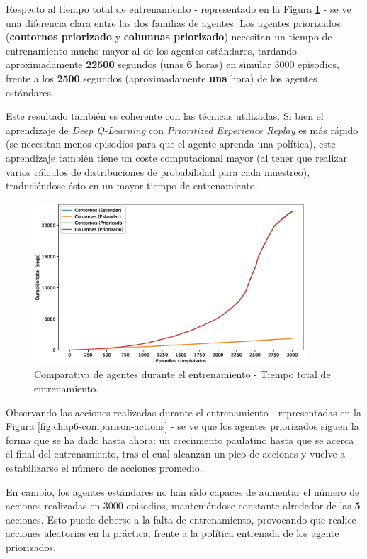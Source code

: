 Respecto al tiempo total de entrenamiento - representado en la Figura \ref{fig:chap6-comparison-time} - se ve una diferencia clara entre las dos familias de agentes. Los agentes priorizados (\textbf{contornos priorizado} y \textbf{columnas priorizado}) necesitan un tiempo de entrenamiento mucho mayor al de los agentes estándares, tardando aproximadamente \textbf{22500} segundos (unas \textbf{6} horas) en simular 3000 episodios, frente a los \textbf{2500} segundos (aproximadamente \textbf{una} hora) de los agentes estándares.

Este resultado también es coherente con las técnicas utilizadas. Si bien el aprendizaje de \textit{Deep Q-Learning} con \textit{Prioritized Experience Replay} es más rápido (se necesitan menos episodios para que el agente aprenda una política), este aprendizaje también tiene un coste computacional mayor (al tener que realizar varios cálculos de distribuciones de probabilidad para cada muestreo), traduciéndose ésto en un mayor tiempo de entrenamiento.

\begin{figure}[h]
    \centering
    \includegraphics[width=0.9\textwidth]{imagenes/cap6/comparison/cumulative_smoothed_times.eps}
    \caption{Comparativa de agentes durante el entrenamiento - Tiempo total de entrenamiento.}
    \label{fig:chap6-comparison-time}
\end{figure}

Observando las acciones realizadas durante el entrenamiento - representadas en la Figura \ref{fig:chap6-comparison-actions} - se ve que los agentes priorizados siguen la forma que se ha dado hasta ahora: un crecimiento paulatino hasta que se acerca el final del entrenamiento, tras el cual alcanzan un pico de acciones y vuelve a estabilizarse el número de acciones promedio. 

En cambio, los agentes estándares no han sido capaces de aumentar el número de acciones realizadas en 3000 episodios, manteniéndose constante alrededor de las \textbf{5} acciones. Esto puede deberse a la falta de entrenamiento, provocando que realice acciones aleatorias en la práctica, frente a la política entrenada de los agente priorizados.

